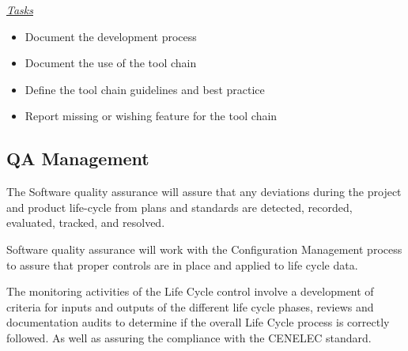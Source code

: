 \documentclass{template/openetcs_article}
\begin{document}
\begin{description}
\underline{\textit{Tasks}}
\begin{itemize}
\item Document the development process
\item Document the use of the tool chain
\item Define the tool chain guidelines and best practice
\item Report missing or wishing feature for the tool chain
\end{itemize}
\end{description}


\subsection{QA Management }
The Software quality assurance will assure that any deviations during the project and product life-cycle from plans and standards are detected, recorded, evaluated, tracked, and resolved.

Software quality assurance will work with the Configuration Management process to assure that proper controls are in place and applied to life cycle data.

The monitoring activities of the Life Cycle control involve a development of criteria for inputs and outputs of the different life cycle phases, reviews and documentation audits to determine if the overall Life Cycle process is correctly followed. As well as assuring the compliance with the CENELEC standard.
\end{document}
